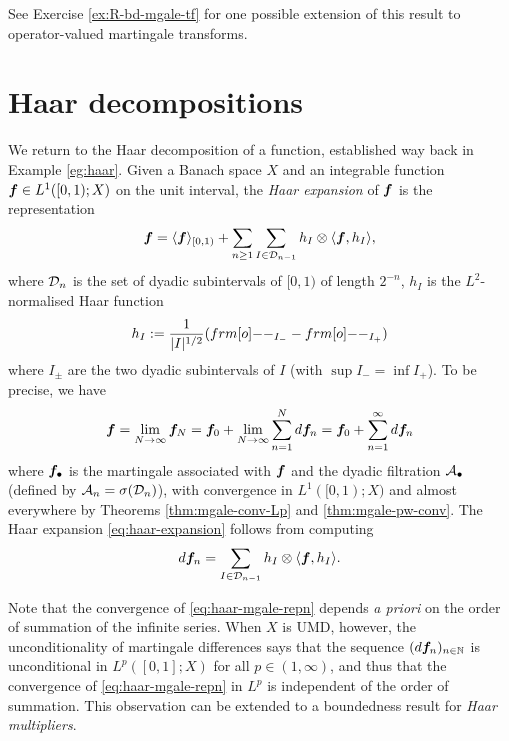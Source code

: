 See Exercise \ref{ex:R-bd-mgale-tf} for one possible extension of this result to operator-valued martingale transforms.

\section{Haar decompositions}\label{sec:haar-decomp}

We return to the Haar decomposition of a function, established way back in Example \ref{eg:haar}.
Given a Banach space $X$ and an integrable function $\bm{f} \in L^1([0,1);X)$ on the unit interval, the \emph{Haar expansion} of $\bm{f}$ is the representation
\begin{equation}\label{eq:haar-expansion}
  \bm{f} = \langle \bm{f} \rangle_{[0,1)} + \sum_{n \geq 1} \sum_{I \in \mathcal{D}_{n-1}} h_{I} \otimes \langle \bm{f}, h_{I} \rangle,
\end{equation}
where $\mathcal{D}_{n}$ is the set of dyadic subintervals of $[0,1)$ of length $2^{-n}$, $h_{I}$ is the $L^2$-normalised Haar function
\begin{equation*}
  h_{I} := \frac{1}{|I|^{1/2}} (\1_{I_{-}} - \1_{I_{+}})
\end{equation*}
where $I_{\pm}$ are the two dyadic subintervals of $I$ (with $\sup I_{-} = \inf I_{+}$).
To be precise, we have
\begin{equation}\label{eq:haar-mgale-repn}
  \bm{f} = \lim_{N \to \infty} \bm{f}_{N} =  \bm{f}_{0} + \lim_{N \to \infty} \sum_{n = 1}^{N} d\bm{f}_{n}
  = \bm{f}_{0} + \sum_{n = 1}^{\infty} d\bm{f}_{n}
\end{equation}
where $\bm{f}_{\bullet}$ is the martingale associated with $\bm{f}$ and the dyadic filtration $\mathcal{A}_{\bullet}$ (defined by $\mathcal{A}_{n} = \sigma(\mathcal{D}_{n})$), with convergence in $L^1([0,1);X)$ and almost everywhere by Theorems \ref{thm:mgale-conv-Lp} and \ref{thm:mgale-pw-conv}.
The Haar expansion \eqref{eq:haar-expansion} follows from computing
\begin{equation}\label{eq:haar-difference}
  d\bm{f}_{n} = \sum_{I \in \mathcal{D}_{n-1}} h_{I} \otimes \langle \bm{f}, h_{I} \rangle.
\end{equation}

Note that the convergence of \eqref{eq:haar-mgale-repn} depends \emph{a priori} on the order of summation of the infinite series.
When $X$ is UMD, however, the unconditionality of martingale differences says that the sequence $(d\bm{f}_{n})_{n \in \mathbb{N}}$ is unconditional in $L^p([0,1];X)$ for all $p \in (1,\infty)$, and thus that the convergence of \eqref{eq:haar-mgale-repn} in $L^p$ is independent of the order of summation.
This observation can be extended to a boundedness result for \emph{Haar multipliers}.

